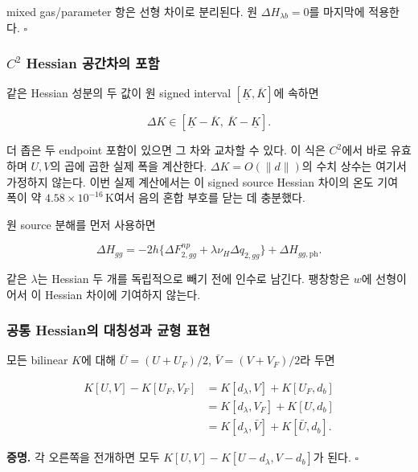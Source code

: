mixed gas/parameter 항은 선형 차이로 분리된다. 원
\(\Delta H_{\lambda b}=0\)를 마지막에 적용한다. \(\square\)

\hypertarget{c2-hessian-uxacf5uxac04uxcc28uxc758-uxd3ecuxd568}{%
\subsubsection{\texorpdfstring{\(C^2\) Hessian 공간차의
포함}{C\^{}2 Hessian 공간차의 포함}}\label{c2-hessian-uxacf5uxac04uxcc28uxc758-uxd3ecuxd568}}

같은 Hessian 성분의 두 값이 원 signed interval
\([\underline K,\overline K]\)에 속하면

\[
\Delta K\in
[\underline K-\overline K,\ \overline K-\underline K].
\tag{18.13}
\]

더 좁은 두 endpoint 포함이 있으면 그 차와 교차할 수 있다. 이 식은
\(C^2\)에서 바로 유효하며 \(U,V\)의 곱에 곱한 실제 폭을 계산한다.
\(\Delta K=O(\|d\|)\)의 수치 상수는 여기서 가정하지 않는다. 이번 실제
계산에서는 이 signed source Hessian 차이의 온도 기여 폭이 약
\(4.58\times10^{-16}\,\mathrm K\)여서 음의 혼합 부호를 닫는 데 충분했다.

원 source 분해를 먼저 사용하면

\[
\Delta H_{gg}
=-2h\{\Delta F^{np}_{2,gg}+\lambda\nu_H\Delta q_{2,gg}\}
+\Delta H_{gg,\mathrm{ph}}.
\tag{18.14}
\]

같은 \(\lambda\)는 Hessian 두 개를 독립적으로 빼기 전에 인수로 남긴다.
팽창항은 \(w\)에 선형이어서 이 Hessian 차이에 기여하지 않는다.

\hypertarget{uxacf5uxd1b5-hessianuxc758-uxb300uxce6duxc131uxacfc-uxade0uxd615-uxd45cuxd604}{%
\subsubsection{공통 Hessian의 대칭성과 균형
표현}\label{uxacf5uxd1b5-hessianuxc758-uxb300uxce6duxc131uxacfc-uxade0uxd615-uxd45cuxd604}}

모든 bilinear \(K\)에 대해 \(\bar U=(U+U_F)/2\), \(\bar V=(V+V_F)/2\)라
두면

\[
\boxed{\begin{aligned}
K[U,V]-K[U_F,V_F]
&=K[d_\lambda,V]+K[U_F,d_b]\\
&=K[d_\lambda,V_F]+K[U,d_b]\\
&=K[d_\lambda,\bar V]+K[\bar U,d_b].
\end{aligned}}
\tag{18.15}
\]

\textbf{증명.} 각 오른쪽을 전개하면 모두
\(K[U,V]-K[U-d_\lambda,V-d_b]\)가 된다. \(\square\)


